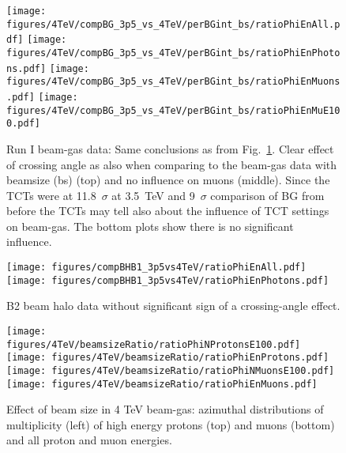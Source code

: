 
\begin{figure}
\begin{center}
  \texttt{[image: figures/4TeV/compBG\_3p5\_vs\_4TeV/perBGint\_bs/ratioPhiEnAll.pdf]}
  \texttt{[image: figures/4TeV/compBG\_3p5\_vs\_4TeV/perBGint\_bs/ratioPhiEnPhotons.pdf]}
  \texttt{[image: figures/4TeV/compBG\_3p5\_vs\_4TeV/perBGint\_bs/ratioPhiEnMuons.pdf]}
  \texttt{[image: figures/4TeV/compBG\_3p5\_vs\_4TeV/perBGint\_bs/ratioPhiEnMuE100.pdf]}
\end{center}
\vspace{-0.6cm}
 \caption{Run I beam-gas data: Same conclusions as from Fig.~\ref{xingCompBG2}. Clear effect of crossing angle as also when comparing to the beam-gas data with beamsize (bs) (top) and no influence on muons (middle). Since the TCTs were at 11.8~$\sigma$ at 3.5~TeV and 9~$\sigma$ comparison of BG from before the TCTs may tell also about the influence of TCT settings on beam-gas. The bottom plots show there is no significant influence.
  \label{xingCompBG2}}
\end{figure}

\begin{figure}
  \begin{center}
    \texttt{[image: figures/compBHB1\_3p5vs4TeV/ratioPhiEnAll.pdf]}
    \texttt{[image: figures/compBHB1\_3p5vs4TeV/ratioPhiEnPhotons.pdf]}

\end{center}
\vspace{-0.6cm}
\caption{B2 beam halo data without significant sign of a crossing-angle effect.
  \label{xingCompBHB2}}
\end{figure}

\begin{figure}%
\begin{center}
  \texttt{[image: figures/4TeV/beamsizeRatio/ratioPhiNProtonsE100.pdf]}
  \texttt{[image: figures/4TeV/beamsizeRatio/ratioPhiEnProtons.pdf]}
  \texttt{[image: figures/4TeV/beamsizeRatio/ratioPhiNMuonsE100.pdf]}
  \texttt{[image: figures/4TeV/beamsizeRatio/ratioPhiEnMuons.pdf]}
\end{center}
\vspace{-0.6cm}
 \caption{Effect of beam size in 4 TeV beam-gas: azimuthal distributions of multiplicity (left) of high energy protons (top) and muons (bottom) and all proton and muon energies. 
  \label{bsRatioPhiMP}}
\end{figure}

